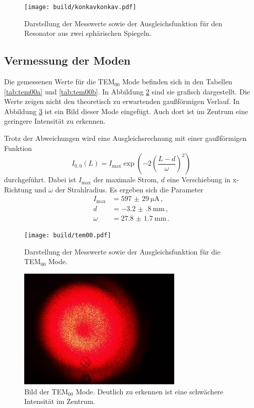 \begin{figure}
  \centering
  \texttt{[image: build/konkavkonkav.pdf]}
  \caption{Darstellung der Messwerte sowie der Ausgleichsfunktion für den
  Resonator aus zwei sphärischen Spiegeln.}
  \label{fig:konkavkonkav}
\end{figure}

\subsection{Vermessung der Moden}
\label{subsec:moden}

Die gemessenen Werte für die TEM$_{\mathrm{00}}$ Mode befinden sich in den Tabellen \ref{tab:tem00a} und \ref{tab:tem00b}. In Abbildung \ref{fig:tem00} sind sie
grafisch dargestellt. Die Werte zeigen nicht den theoretisch zu erwartenden gaußförmigen
Verlauf. In Abbildung \ref{fig:bild} ist ein Bild dieser Mode eingefügt. Auch dort
ist im Zentrum eine geringere Intensität zu erkennen.

Trotz der Abweichungen wird eine Ausgleichsrechnung mit einer gaußförmigen Funktion
\begin{equation*}
  I_{0,0}(L)=I_{\text{max}} \exp\left(-2 \left(\frac{L-d}{\omega}\right)^2\right)
\end{equation*}
durchgeführt. Dabei ist $I_{\text{max}}$ der maximale Strom, $d$ eine Verschiebung in
x-Richtung und $\omega$ der Strahlradius. Es ergeben sich die Parameter
\begin{align*}
  I_{\text{max}}&=\SI{597(29)}{\micro\ampere} \,,\\
  d&= \SI{-3.2(8)}{\milli\metre} \,, \\
  \omega&=\SI{27.8(17)}{\milli\metre} \,.
\end{align*}

\begin{figure}
  \centering
  \texttt{[image: build/tem00.pdf]}
  \caption{Darstellung der Messwerte sowie der Ausgleichsfunktion für die TEM$_{\mathrm{00}}$ Mode.}
  \label{fig:tem00}
\end{figure}

\begin{figure}
  \centering
  \includegraphics[width=0.7\textwidth]{data/tem00.png}
  \caption{Bild der TEM$_{\mathrm{00}}$ Mode. Deutlich zu erkennen ist eine schwächere Intensität im Zentrum.}
  \label{fig:bild}
\end{figure}


